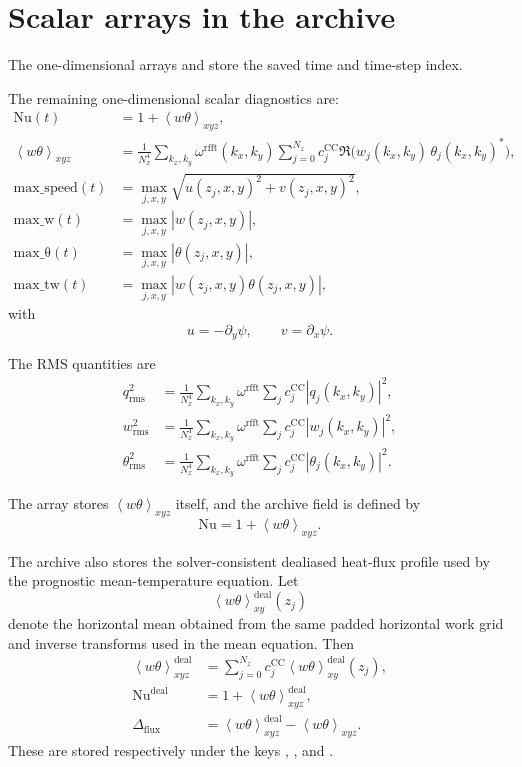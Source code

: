 \documentclass[11pt]{article}
\newcommand{\avg}[1]{\left\langle #1 \right\rangle}
\newcommand{\cc}{c^{\mathrm{CC}}}
\newcommand{\rr}{\omega^{\mathrm{rfft}}}
\begin{document}
\section{Scalar arrays in the archive}

The one-dimensional arrays  and  store the saved time and
time-step index.

The remaining one-dimensional scalar diagnostics are:
\begin{align*}
\mathrm{Nu}(t)
&=
1 + \avg{w\theta}_{xyz},\\
\avg{w\theta}_{xyz}
&=
\frac{1}{N_x^4}
\sum_{k_x,k_y}\rr(k_x,k_y)
\sum_{j=0}^{N_z}\cc_j
\Re\!\bigl(w_j(k_x,k_y)\,\theta_j(k_x,k_y)^*\bigr),\\
\mathrm{max\_speed}(t)
&=
\max_{j,x,y}\sqrt{u(z_j,x,y)^2 + v(z_j,x,y)^2},\\
\mathrm{max\_w}(t)
&=
\max_{j,x,y}|w(z_j,x,y)|,\\
\mathrm{max\_\theta}(t)
&=
\max_{j,x,y}|\theta(z_j,x,y)|,\\
\mathrm{max\_tw}(t)
&=
\max_{j,x,y}|w(z_j,x,y)\theta(z_j,x,y)|,
\end{align*}
with
\[
u = -\partial_y \psi,
\qquad
v = \partial_x \psi.
\]

The RMS quantities are
\begin{align*}
q_{\mathrm{rms}}^2
&=
\frac{1}{N_x^4}
\sum_{k_x,k_y}\rr
\sum_j \cc_j |q_j(k_x,k_y)|^2,\\
w_{\mathrm{rms}}^2
&=
\frac{1}{N_x^4}
\sum_{k_x,k_y}\rr
\sum_j \cc_j |w_j(k_x,k_y)|^2,\\
\theta_{\mathrm{rms}}^2
&=
\frac{1}{N_x^4}
\sum_{k_x,k_y}\rr
\sum_j \cc_j |\theta_j(k_x,k_y)|^2.
\end{align*}

The array  stores \(\avg{w\theta}_{xyz}\) itself, and the
archive field  is defined by
\[
\mathrm{Nu} = 1 + \avg{w\theta}_{xyz}.
\]

The archive also stores the solver-consistent dealiased heat-flux profile used
by the prognostic mean-temperature equation. Let
\[
\avg{w\theta}_{xy}^{\mathrm{deal}}(z_j)
\]
denote the horizontal mean obtained from the same padded horizontal work grid
and inverse transforms used in the mean equation. Then
\begin{align*}
\avg{w\theta}_{xyz}^{\mathrm{deal}}
&=
\sum_{j=0}^{N_z}\cc_j \avg{w\theta}_{xy}^{\mathrm{deal}}(z_j),\\
\mathrm{Nu}^{\mathrm{deal}}
&=
1 + \avg{w\theta}_{xyz}^{\mathrm{deal}},\\
\Delta_{\mathrm{flux}}
&=
\avg{w\theta}_{xyz}^{\mathrm{deal}} - \avg{w\theta}_{xyz}.
\end{align*}
These are stored respectively under the keys ,
, and .
\end{document}
